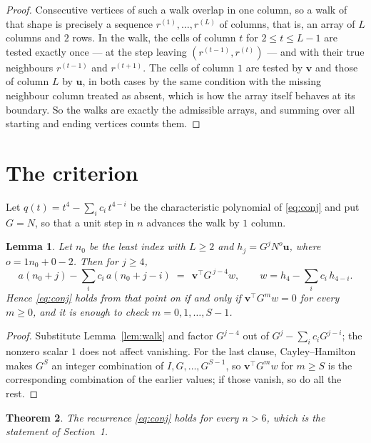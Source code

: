 \documentclass[11pt,a4paper]{article}
\theoremstyle{plain}
\newtheorem{theorem}{Theorem}
\newtheorem{lemma}[theorem]{Lemma}
\theoremstyle{definition}
\begin{document}
\begin{proof}
Consecutive vertices of such a walk overlap in one column, so a walk of that shape is
precisely a sequence $r^{(1)},\dots,r^{(L)}$ of columns, that is, an array of $L$ columns
and $2$ rows. In the walk, the cells of column $t$ for $2\le t\le L-1$ are tested
exactly once --- at the step leaving $(r^{(t-1)},r^{(t)})$ --- and with their true
neighbours $r^{(t-1)}$ and $r^{(t+1)}$. The cells of column $1$ are tested by
$\mathbf{v}$ and those of column $L$ by $\mathbf{u}$, in both cases by the same condition
with the missing neighbour column treated as absent, which is how the array itself behaves at
its boundary. So the walks are exactly the admissible arrays, and summing over all starting
and ending vertices counts them.
\end{proof}

\section{The criterion}

Let $q(t)=t^{4}-\sum_i c_i\,t^{4-i}$ be the characteristic polynomial of
\eqref{eq:conj} and put $G=N$, so that a unit step in $n$ advances the walk by
$1$ column.

\begin{lemma}\label{lem:crit}
Let $n_0$ be the least index with $L\ge2$ and $h_j=G^{j}N^{o}\mathbf{u}$, where
$o=1n_0+0-2$. Then for $j\ge4$,
\[
a(n_0+j)-\sum_i c_i\,a(n_0+j-i)\;=\;\,\mathbf{v}^{\!\top}G^{\,j-4}w,
\qquad w=h_{4}-\sum_i c_i\,h_{4-i} .
\]
Hence \eqref{eq:conj} holds from that point on if and only if
$\mathbf{v}^{\!\top}G^{m}w=0$ for every $m\ge0$, and it is enough to check
$m=0,1,\dots,S-1$.
\end{lemma}

\begin{proof}
Substitute Lemma~\ref{lem:walk} and factor $G^{j-4}$ out of
$G^{j}-\sum_ic_iG^{j-i}$; the nonzero scalar $1$ does not affect
vanishing. For the last clause, Cayley--Hamilton makes $G^{S}$ an integer combination of
$I,G,\dots,G^{S-1}$, so $\mathbf{v}^{\!\top}G^{m}w$ for $m\ge S$ is the corresponding
combination of the earlier values; if those vanish, so do all the rest.
\end{proof}

\begin{theorem}
The recurrence \eqref{eq:conj} holds for every $n>6$, which is the statement of
Section~1.
\end{theorem}
\end{document}
